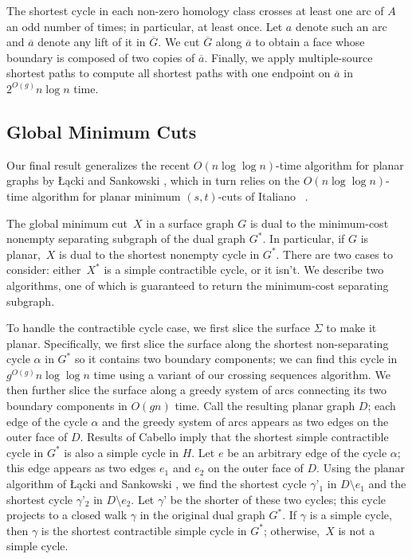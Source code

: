 \documentclass[natbib]{svcyclop}
\begin{document}
The shortest cycle in each non-zero homology class crosses at least one arc of $A$ an odd number of times; in particular, at least once.
Let $a$ denote such an arc and $\overline{a}$ denote any lift of it in $\overline{G}$.  We cut $\overline{G}$ along $\overline{a}$ to obtain a face whose boundary is composed of two copies of $\overline{a}$.
Finally, we apply multiple-source shortest paths \cite{cce-msspe-13} to compute all shortest paths with one endpoint on $\overline{a}$ in $2^{O(g)}n\log n$ time.

\subsection{Global Minimum Cuts}

Our final result generalizes the recent $O(n\log \log n)$-time algorithm for planar graphs by Łącki and Sankowski \cite{ls-mcsc-11}, which in turn relies on the $O(n\log\log n)$-time algorithm for planar minimum $(s,t)$-cuts of Italiano \etal\ \cite{insw-iamcmf-11}.

The global minimum cut~$X$ in a surface graph $G$ is dual to the minimum-cost nonempty separating subgraph of the dual graph $G^*$.  In particular, if $G$ is planar,~$X$ is dual to the shortest nonempty cycle in $G^*$.
There are two cases to consider: either~$X^*$ is a simple contractible cycle, or it isn’t.  We describe two algorithms, one of which is guaranteed to return the minimum-cost separating subgraph.


To handle the contractible cycle case, we first slice the surface $\Sigma$ to make it planar.  Specifically, we first slice the surface along the shortest non-separating cycle $\alpha$ in $G^*$ so it contains two boundary components; we can find this cycle in $g^{O(g)}n\log\log n$ time using a variant of our crossing sequences algorithm.
We then further slice the surface along a greedy system of arcs connecting its two boundary components in $O(gn)$ time.
Call the resulting planar graph $D$; each edge of the cycle $\alpha$ and the greedy system of arcs appears as two edges on the outer face of $D$.  Results of Cabello \cite{c-fscss-10} imply that the shortest simple contractible cycle in  $G^*$ is also a simple cycle in $H$.  Let $e$ be an arbitrary edge of the cycle $\alpha$; this edge appears as two edges $e_1$ and $e_2$ on the outer face of $D$.  Using the planar algorithm of Łącki and Sankowski \cite{ls-mcsc-11}, we find the shortest cycle $\gamma’_1$ in  $D\setminus e_1$ and the shortest cycle $\gamma’_2$ in $D\setminus e_2$.  Let $\gamma’$ be the shorter of these two cycles; this cycle projects to a closed walk $\gamma$ in the original dual graph $G^*$.  If $\gamma$ is a simple cycle, then $\gamma$ is the shortest contractible simple cycle in $G^*$; otherwise,~$X$ is not a simple cycle.
\end{document}
